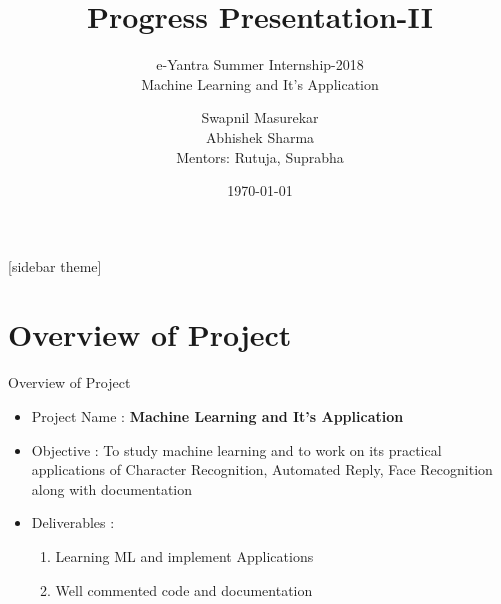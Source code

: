 \documentclass[10pt, a4paper]{beamer}
\begin{document}
	\title{Progress Presentation-II}
	\subtitle{e-Yantra Summer Internship-2018 \\Machine Learning and It's Application}
	\author{Swapnil Masurekar\\Abhishek Sharma\\
	Mentors: Rutuja, Suprabha}
	\date{\today}
	\frame{\titlepage}

[sidebar theme]
\section{Overview of Project}
\begin{frame}{Overview of Project}
	
	\begin{itemize}
		\item Project Name : \textbf{Machine Learning and It's Application}\\
		\item Objective : To study machine learning and to work on its practical applications of Character Recognition, Automated Reply, Face Recognition along with documentation\\
		\item Deliverables : 
          \begin{enumerate}
          \item Learning ML and implement Applications
          \item Well commented code and documentation\\ 
          \end{enumerate}
	\end{itemize}
\end{frame}
\end{document}
